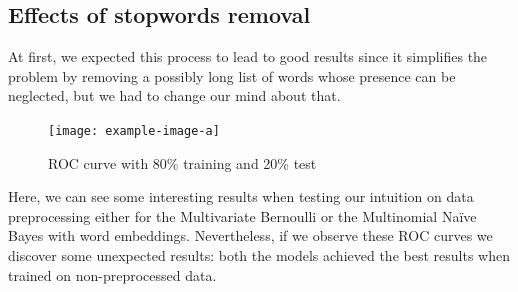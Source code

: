 \subsection*{Effects of stopwords removal}

At first, we expected this process to lead to good results since it simplifies the problem by removing a possibly long list of words whose presence can be neglected, but we had to change our mind about that.
\clearpage


\begin{figure}[h!t]
    \centering
    \texttt{[image: example-image-a]}
    \caption{ROC curve with 80\% training and 20\% test}
    \label{fig:PREPROCESSING_ROC}
\end{figure}

Here, we can see some interesting results when testing our intuition on data preprocessing either for the Multivariate Bernoulli or the Multinomial Naïve Bayes with word embeddings. Nevertheless, if we observe these ROC curves we discover some unexpected results: both the models achieved the best results when trained on non-preprocessed data.